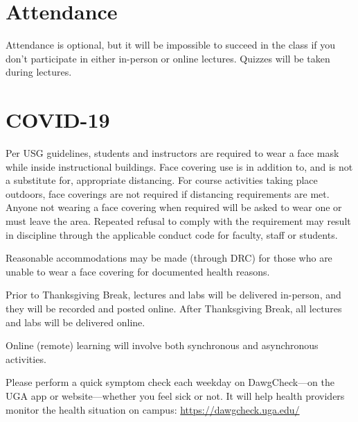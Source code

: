\documentclass[12pt]{article}
\begin{document}
\section*{\normalsize Attendance}
\vspace{-4mm}
Attendance is optional, but it will be impossible to succeed in the
class if you don't participate in either in-person or online
lectures. Quizzes will be taken during lectures.  

\vspace{-2mm}
\section*{\normalsize COVID-19}
\vspace{-4mm}
Per USG guidelines, students and instructors are required to wear a
face mask while inside instructional buildings. Face covering use is
in addition to, and is not a substitute for, appropriate
distancing. For course activities taking place outdoors, face
coverings are not required if distancing requirements are met. Anyone
not wearing a face covering when required will be asked to wear one or
must leave the area. Repeated refusal to comply with the requirement
may result in discipline through the applicable conduct code for
faculty, staff or students.

Reasonable accommodations may be made (through DRC) for those who are
unable to wear a face covering for documented health reasons. 

Prior to Thanksgiving Break, lectures and labs will be delivered
in-person, and they will be recorded and posted online. After
Thanksgiving Break, all lectures and labs will be delivered online. 

Online (remote) learning will involve both synchronous and
asynchronous activities.




Please perform a quick symptom check each weekday on DawgCheck—on the
UGA app or website—whether you feel sick or not. It will help health
providers monitor the health situation on campus:
\url{https://dawgcheck.uga.edu/}

\end{document}
